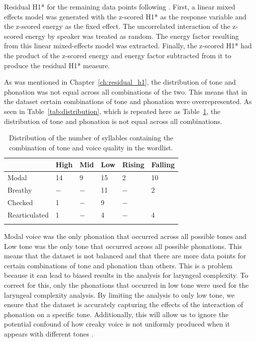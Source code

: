Residual H1* for the remaining data points following \citet{chaiH1H2AcousticMeasure2022}. First, a linear mixed effects model was generated with the z-scored H1* as the response variable and the z-scored energy as the fixed effect. The uncorrelated interaction of the z-scored energy by speaker was treated as random. The energy factor resulting from this linear mixed-effects model was extracted. Finally, the z-scored H1* had the product of the z-scored energy and energy factor subtracted from it to produce the residual H1* measure.

As was mentioned in Chapter~\ref{ch:residual_h1}, the distribution of tone and phonation was not equal across all combinations of the two. This means that in the dataset certain combinations of tone and phonation were overrepresented. As seen in Table~\ref{tab:distribution}, which is repeated here as Table~\ref{tab:distribution_repeat}, the distribution of tone and phonation is not equal across all combinations. 

\begin{table}[!h]
    \centering
    \caption{Distribution of the number of syllables containing the combination of tone and voice quality in the wordlist.}
    \label{tab:distribution_repeat}
      \begin{tabular}{llllll}
      \lsptoprule
      & High & Mid & Low & Rising & Falling\\
      \hline
      Modal & 14 & 9 & 15 & 2 & 10 \\
      Breathy & $-$ & $-$ & 11 & $-$ & 2 \\
      Checked & 1 & $-$ & 9 & $-$ & \\
      Rearticulated & 1 & $-$ & 4 & $-$ & 4 \\
      \lspbottomrule
      \end{tabular}
\end{table}

Modal voice was the only phonation that occurred across all possible tones and Low tone was the only tone that occurred across all possible phonations. This means that the dataset is not balanced and that there are more data points for certain combinations of tone and phonation than others. This is a problem because it can lead to biased results in the analysis for laryngeal complexity. To correct for this, only the phonations that occurred in low tone were used for the laryngeal complexity analysis. By limiting the analysis to only low tone, we ensure that the dataset is accurately capturing the effects of the interaction of phonation on a specific tone. Additionally, this will allow us to ignore the potential confound of how creaky voice is not uniformly produced when it appears with different tones \citep{keatingAcousticPropertiesDifferent2015}.

